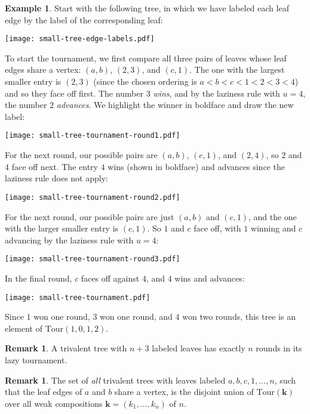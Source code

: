 \documentclass[11pt]{amsart}
\newcommand{\Tour}{\mathrm{Tour}}
\numberwithin{thm}{section}
\numberwithin{equation}{section}
\numberwithin{figure}{section}
\theoremstyle{definition}
\newtheorem{example}[thm]{Example}
\newtheorem{remark}[thm]{Remark}
\begin{document}
\begin{example}\label{ex:tournament}
Start with the following tree, in which we have labeled each leaf edge by the label of the corresponding leaf:
\begin{center}
\texttt{[image: small-tree-edge-labels.pdf]}
\end{center}
To start the tournament, we first compare all three pairs of leaves whose leaf edges share a vertex: $(a,b)$, $(2,3)$, and $(c,1)$.  The one with the largest smaller entry is $(2,3)$ (since the chosen ordering is $a<b<c<1<2<3<4$) and so they face off first.  The number $3$ \emph{wins}, and by the laziness rule with $u=4$, the number $2$ \emph{advances}.  We highlight the winner in boldface and draw the new label:
\begin{center}
\texttt{[image: small-tree-tournament-round1.pdf]}
\end{center}
For the next round, our possible pairs are $(a,b)$, $(c,1)$, and $(2,4)$, so $2$ and $4$ face off next.  The entry $4$ wins (shown in boldface) and advances since the laziness rule does not apply:
\begin{center}
\texttt{[image: small-tree-tournament-round2.pdf]}
\end{center}
For the next round, our possible pairs are just $(a,b)$ and $(c,1)$, and the one with the larger smaller entry is $(c,1)$.  So $1$ and $c$ face off, with $1$ winning and $c$ advancing by the laziness rule with $u=4$:
\begin{center}
\texttt{[image: small-tree-tournament-round3.pdf]}
\end{center}
In the final round, $c$ faces off against $4$, and $4$ wins and advances:
\begin{center}
\texttt{[image: small-tree-tournament.pdf]}
\end{center}
Since $1$ won one round, $3$ won one round, and $4$ won two rounds, this tree is an element of $\Tour(1,0,1,2)$.
\end{example}

\begin{remark}
A trivalent tree with $n+3$ labeled leaves has exactly $n$ rounds in its lazy tournament.
\end{remark}

\begin{remark}
The set of \emph{all} trivalent trees with leaves labeled $a, b, c, 1, \ldots, n$, such that the leaf edges of $a$ and $b$ share a vertex, is the disjoint union of $\Tour(\mathbf{k})$ over all weak compositions $\mathbf{k} = (k_1, \ldots, k_n)$ of $n$.
\end{remark}
\end{document}
